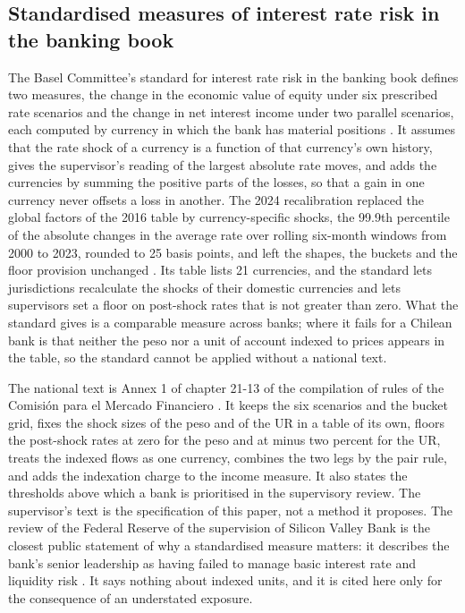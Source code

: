 \subsection{Standardised measures of interest rate risk in the banking book}
\label{sec:rw-standard}

The Basel Committee's standard for interest rate risk in the banking book defines two measures, the change in the economic value of equity under six prescribed rate scenarios and the change in net interest income under two parallel scenarios, each computed by currency in which the bank has material positions \citep{BCBS_d368,BCBS_SRP31}. It assumes that the rate shock of a currency is a function of that currency's own history, gives the supervisor's reading of the largest absolute rate moves, and adds the currencies by summing the positive parts of the losses, so that a gain in one currency never offsets a loss in another. The 2024 recalibration replaced the global factors of the 2016 table by currency-specific shocks, the 99.9th percentile of the absolute changes in the average rate over rolling six-month windows from 2000 to 2023, rounded to 25 basis points, and left the shapes, the buckets and the floor provision unchanged \citep{BCBS_d578}. Its table lists 21 currencies, and the standard lets jurisdictions recalculate the shocks of their domestic currencies and lets supervisors set a floor on post-shock rates that is not greater than zero. What the standard gives is a comparable measure across banks; where it fails for a Chilean bank is that neither the peso nor a unit of account indexed to prices appears in the table, so the standard cannot be applied without a national text.

The national text is Annex 1 of chapter 21-13 of the compilation of rules of the Comisi\'on para el Mercado Financiero \citep{CMF_RAN_21_13}. It keeps the six scenarios and the bucket grid, fixes the shock sizes of the peso and of the UR in a table of its own, floors the post-shock rates at zero for the peso and at minus two percent for the UR, treats the indexed flows as one currency, combines the two legs by the pair rule, and adds the indexation charge to the income measure. It also states the thresholds above which a bank is prioritised in the supervisory review. The supervisor's text is the specification of this paper, not a method it proposes. The review of the Federal Reserve of the supervision of Silicon Valley Bank is the closest public statement of why a standardised measure matters: it describes the bank's senior leadership as having failed to manage basic interest rate and liquidity risk \citep{FRB_SVB}. It says nothing about indexed units, and it is cited here only for the consequence of an understated exposure.

